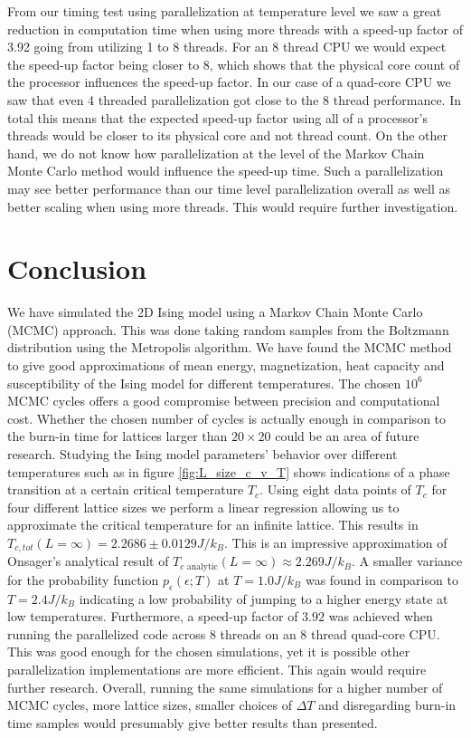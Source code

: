 \documentclass[english,notitlepage,reprint,nofootinbib]{revtex4-1}  %
\begin{document}

From our timing test using parallelization at temperature level we saw a great reduction in computation time when using more threads with a speed-up factor of 3.92 going from utilizing 1 to 8 threads. For an 8 thread CPU we would expect the speed-up factor being closer to 8, which shows that the physical core count of the processor influences the speed-up factor. In our case of a quad-core CPU we saw that even 4 threaded parallelization got close to the 8 thread performance. In total this means that the expected speed-up factor using all of a processor's threads would be closer to its physical core and not thread count. On the other hand, we do not know how parallelization at the level of the Markov Chain Monte Carlo method would influence the speed-up time. Such a parallelization may see better performance than our time level parallelization overall as well as better scaling when using more threads. This would require further investigation.


\section{Conclusion}\label{sec:conclusion}
We have simulated the 2D Ising model using a Markov Chain Monte Carlo (MCMC) approach. This was done taking random samples from the Boltzmann distribution using the Metropolis algorithm. We have found the MCMC method to give good approximations of mean energy, magnetization, heat capacity and susceptibility of the Ising model for different temperatures. The chosen $10^6$ MCMC cycles offers a good compromise between precision and computational cost. Whether the chosen number of cycles is actually enough in comparison to the burn-in time for lattices larger than $20 \times 20$ could be an area of future research.
Studying the Ising model parameters' behavior over different temperatures such as in figure \ref{fig:L_size_c_v_T} shows indications of a phase transition at a certain critical temperature $T_c$. Using eight data points of $T_c$ for four different lattice sizes we perform a linear regression allowing us to approximate the critical temperature for an infinite lattice. This results in $T_{c,tot}(L=\infty) = 2.2686 \pm 0.0129  J/k_B$. This is an impressive approximation of Onsager's analytical result of  $T_{c \text{ analytic}}(L=\infty) \approx 2.269 J/k_B$.
A smaller variance for the probability function $p_{\epsilon}(\epsilon ; T)$ at $T=1.0J/k_B$ was found in comparison to $T=2.4J/k_B$ indicating a low probability of jumping to a higher energy state at low temperatures.
Furthermore, a speed-up factor of $3.92$ was achieved when running the parallelized code across 8 threads on an 8 thread quad-core CPU. This was good enough for the chosen simulations, yet it is possible other parallelization implementations are more efficient. This again would require further research. Overall, running the same simulations for a higher number of MCMC cycles, more lattice sizes, smaller choices of $\Delta T$ and disregarding burn-in time samples would presumably give better results than presented.
\end{document}
